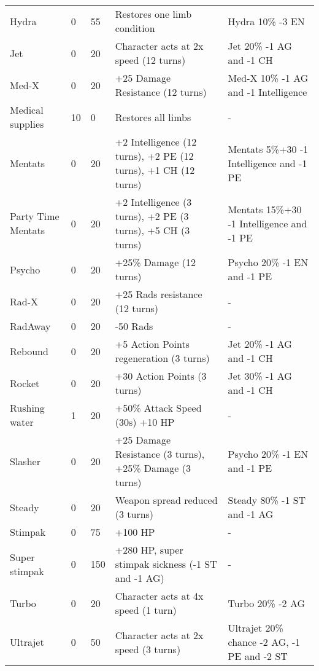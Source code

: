 \begin{longtable}{|p{4cm}|p{1.2cm}|p{1.2cm}|p{4cm}|p{4cm}|}
Hydra & 0 & 55 & Restores one limb condition & Hydra 10\% -3 EN \\
Jet & 0 & 20 & Character acts at 2x speed (12 turns) & Jet 20\% -1 AG and -1 CH \\
Med-X & 0 & 20 & +25 Damage Resistance (12 turns) & Med-X 10\% -1 AG and -1 Intelligence \\
Medical supplies & 10 & 0 & Restores all limbs & - \\
Mentats & 0 & 20 & +2 Intelligence (12 turns), +2 PE (12 turns), +1 CH (12 turns) & Mentats 5\%+30 -1 Intelligence and -1 PE \\
Party Time Mentats & 0 & 20 & +2 Intelligence (3 turns), +2 PE (3 turns), +5 CH (3 turns) & Mentats 15\%+30 -1 Intelligence and -1 PE \\
Psycho & 0 & 20 & +25\% Damage (12 turns) & Psycho 20\% -1 EN and -1 PE \\
Rad-X & 0 & 20 & +25 Rads resistance (12 turns) & - \\
RadAway & 0 & 20 & -50 Rads & - \\
Rebound & 0 & 20 & +5 Action Points regeneration (3 turns) & Jet 20\% -1 AG and -1 CH \\
Rocket & 0 & 20 & +30 Action Points (3 turns) & Jet 30\% -1 AG and -1 CH \\
Rushing water & 1 & 20 & +50\% Attack Speed (30s) +10 HP & - \\
Slasher & 0 & 20 & +25 Damage Resistance (3 turns), +25\% Damage (3 turns) & Psycho 20\% -1 EN and -1 PE \\
Steady & 0 & 20 & Weapon spread reduced (3 turns) & Steady 80\% -1 ST and -1 AG \\
Stimpak & 0 & 75 & +100 HP & - \\
Super stimpak & 0 & 150 & +280 HP, super stimpak sickness (-1 ST and -1 AG) & - \\
Turbo & 0 & 20 & Character acts at 4x speed (1 turn) & Turbo 20\% -2 AG \\
Ultrajet & 0 & 50 & Character acts at 2x speed (3 turns) & Ultrajet 20\% chance -2 AG, -1 PE and -2 ST \\
\hline
\end{longtable}
